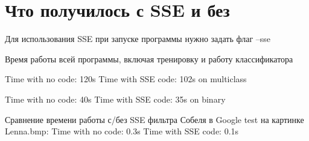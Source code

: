 \section*{Что получилось с S\-S\-E и без }

Для использования S\-S\-E при запуске программы нужно задать флаг --sse

Время работы всей программы, включая тренировку и работу классификатора

Time with no code\-: 120s Time with S\-S\-E code\-: 102s on multiclass

Time with no code\-: 40s Time with S\-S\-E code\-: 35s on binary

Сравнение времени работы с/без S\-S\-E фильтра Собеля в Google test на картинке Lenna.\-bmp\-: Time with no code\-: 0.\-3s Time with S\-S\-E code\-: 0.\-1s 